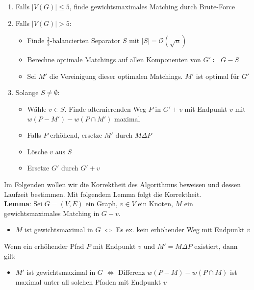\begin{enumerate}
	\item Falls $|V(G)|\leq 5$, finde gewichtsmaximales Matching durch Brute-Force
	\item Falls $|V(G)|> 5$:
	\begin{itemize}
		\item Finde $\frac{2}{3}$-balancierten Separator $S$ mit $|S|=\mathcal{O}(\sqrt{n})$
		\item Berechne optimale Matchings auf allen Komponenten von $G'\coloneqq G-S$
		\item Sei $M'$ die Vereinigung dieser optimalen Matchings. $M'$ ist optimal für $G'$
	\end{itemize} 
	\pagebreak

	\item Solange $S\neq\emptyset$:
	\begin{itemize}
		\item Wähle $v\in S$. Finde alternierenden Weg $P$ in $G'+v$ mit Endpunkt $v$ mit $w(P-M')-w(P\cap M')$ maximal
		\item Falls $P$ erhöhend, ersetze $M'$ durch $M\Delta P$
		\item Lösche $v$ aus $S$
		\item Ersetze $G'$ durch $G'+v$
	\end{itemize}
\end{enumerate}

Im Folgenden wollen wir die Korrektheit des Algorithmus beweisen und dessen Laufzeit bestimmen. Mit folgendem Lemma folgt die Korrektheit.\\

\textbf{Lemma}: Sei $G=(V,E)$ ein Graph, $v\in V$ ein Knoten, $M$ ein gewichtsmaximales Matching in $G-v$. 
\begin{itemize}
	\item $M$ ist gewichtsmaximal in $G$ $\iff$ Es ex. kein erhöhender Weg mit Endpunkt $v$
\end{itemize}
Wenn ein erhöhender Pfad $P$ mit Endpunkt $v$ und $M'=M\Delta P$ existiert, dann gilt:
\begin{itemize}
	\item $M'$ ist gewichtsmaximal in $G$ $\iff$ Differenz $w(P-M)-w(P\cap M)$ ist maximal unter all solchen Pfaden mit Endpunkt $v$
\end{itemize}

